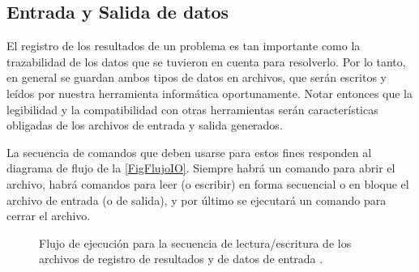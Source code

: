 \subsection{Entrada y Salida de datos}


El registro de los resultados de un problema es tan 
importante como la trazabilidad de los datos 
que se tuvieron en cuenta para resolverlo. Por lo tanto, 
en general se guardan ambos tipos de datos en archivos, 
que serán escritos y leídos por nuestra herramienta 
informática oportunamente. Notar entonces que la legibilidad
y la compatibilidad con otras herramientas 
serán características obligadas de los archivos
de entrada y salida generados.

La secuencia de comandos que deben usarse para estos
fines responden al diagrama de flujo de la 
\autoref{FigFlujoIO}. Siempre habrá un comando para 
abrir el archivo, habrá comandos para leer (o 
escribir) en forma secuencial o en bloque 
el archivo de entrada
(o de salida), y por último se ejecutará un comando 
para cerrar el archivo.

\begin{figure}
\caption{Flujo de ejecución para la secuencia de 
lectura/escritura de los archivos de registro de resultados
y de datos de entrada \label{FigFlujoIO}.}
\end{figure}

\mode*


